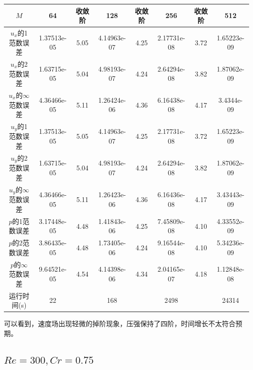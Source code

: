 \documentclass[lang=cn,10pt,bibend=bibtex]{elegantbook}
\begin{document}
\begin{table}[H]
  \centering
  \small
  \begin{tabular}{c|ccccccc}
  \textbf{$M$}              & 64          & 收敛阶 & 128         & 收敛阶 & 256         & 收敛阶 & 512   \\ \hline
  $u_x$的1范数误差 & 1.37513e-05 & 5.05 & 4.14963e-07 & 4.25 & 2.17731e-08 & 3.72 & 1.65223e-09\\
  $u_x$的2范数误差 &  1.63715e-05 & 5.04 & 4.98193e-07 & 4.24 & 2.64294e-08 & 3.82 & 1.87062e-09\\
  $u_x$的$\infty$范数误差 & 4.36466e-05 & 5.11 & 1.26424e-06 & 4.36 & 6.16438e-08 & 4.17 & 3.4344e-09\\
  $u_y$的1范数误差 & 1.37513e-05 & 5.05 & 4.14963e-07 & 4.25 & 2.17731e-08 & 3.72 & 1.65223e-09\\
  $u_y$的2范数误差 & 1.63715e-05 & 5.04 & 4.98193e-07 & 4.24 & 2.64294e-08 & 3.82 & 1.87062e-09\\
  $u_y$的$\infty$范数误差 & 4.36466e-05 & 5.11 & 1.26423e-06 & 4.36 & 6.16436e-08 & 4.17 & 3.43443e-09\\
  $p$的1范数误差 & 3.17448e-05 & 4.48 & 1.41843e-06 & 4.25 & 7.45809e-08 & 4.10 & 4.33552e-09\\
  $p$的2范数误差 & 3.86435e-05 & 4.48 & 1.73405e-06 & 4.24 & 9.16544e-08 & 4.10 & 5.34236e-09\\ 
  $p$的$\infty$范数误差 &  9.64521e-05 & 4.54 & 4.14398e-06 & 4.34 & 2.04165e-07 & 4.18 & 1.12848e-08\\
  运行时间(s)    &    22        &            &    168   &           &   2498    &          &    24314   
  \end{tabular}
\end{table}

可以看到，速度场出现轻微的掉阶现象，压强保持了四阶，时间增长不太符合预期。

\subsection{$Re=300,Cr=0.75$}
\end{document}
